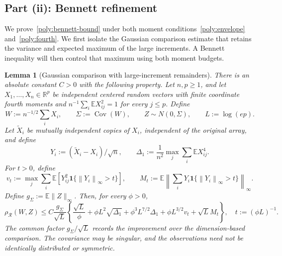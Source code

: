 \documentclass[11pt,letterpaper]{article}
\newenvironment{recovered}{}{}
\newenvironment{vSixBlock}{\color{magenta}}{}
\newtheorem{lemma}{Lemma}
\theoremstyle{remark}
\newcommand{\E}{\mathbb E}
\newcommand{\R}{\mathbb R}
\newcommand{\Cov}{\operatorname{Cov}}
\newcommand{\norm}[1]{\left\lVert#1\right\rVert}
\newcommand{\rh}{\rho_{\mathcal R}}
\newcommand{\ind}{\mathbf 1}
\begin{document}
\subsection{\texorpdfstring{{Part (ii): Bennett refinement}}{Part (ii): Bennett refinement}}\label{app:bennett}

\begin{recovered}
We prove~\eqref{poly:bennett-bound} under both moment
conditions~\eqref{poly:envelope} and~\eqref{poly:fourth}.
We first isolate the Gaussian comparison estimate that retains the
variance and expected maximum of the large increments. A Bennett
inequality will then control that maximum using both moment budgets.

\begin{lemma}[Gaussian comparison with large-increment remainders]
\label{ben:comparison}
There is an absolute constant \(C>0\) with the following property.
Let \(n,p\ge1\), and let \(X_1,\ldots,X_n\in\R^p\) be independent
centered random vectors with finite coordinate fourth moments and
\(n^{-1}\sum_i\E X_{ij}^2=1\) for every \(j\le p\). {Define}
\[
 W:=n^{-1/2}\sum_iX_i,\qquad \Sigma:=\Cov(W),\qquad
 Z\sim N(0,\Sigma),\qquad L:=\log(ep).
\]
Let \(\widetilde X_i\) be mutually independent copies of \(X_i\),
independent of the original array, and define
\[
 Y_i:=(\widetilde X_i-X_i)/\sqrt n,\qquad
 \Delta_1:=\frac1{n^2}\max_j\sum_i\E X_{ij}^4.
\]
For \(t>0\), define
\[
 v_t:=\max_j\sum_i\E[Y_{ij}^2\ind\{\norm{Y_i}_\infty>t\}],
 \qquad M_t:=\E\norm{\sum_iY_i\ind\{\norm{Y_i}_\infty>t\}}_\infty.
\]
\begin{vSixBlock}
Define \(g_\Sigma:=\E\|Z\|_\infty\). Then, for every \(\phi>0\),
\begin{equation}
 \rh(W,Z)\le C\frac{g_\Sigma}{\sqrt L}\left\{
 \frac{\sqrt L}{\phi}+\phi L^2\sqrt{\Delta_1}
 +\phi^3L^{7/2}\Delta_1+\phi L^{3/2}v_t+\sqrt L M_t\right\},
 \quad t:=(\phi L)^{-1}.
 \label{ben:master}
\end{equation}
The common factor \(g_\Sigma/\sqrt L\) records the improvement over
the dimension-based comparison.
\end{vSixBlock}
The covariance may be singular, and the observations need not be
identically distributed or symmetric.
\end{lemma}
\end{recovered}
\end{document}
